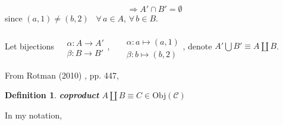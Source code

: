 \documentclass[10pt]{amsart}
\newtheorem{definition}{Definition}
\begin{document}
\begin{multicols*}{2}
\[
\Longrightarrow A' \cap B' = \emptyset 
\]
since $(a,1) \neq (b,2)$ \, $\forall \, a \in A$, $\forall \, b \in B$.

Let bijections $\begin{aligned} & \quad \\
& \alpha : A \to A' \\
& \beta : B \to B' \end{aligned}$, \qquad \, $\begin{aligned} & \quad \\
& \alpha : a \mapsto (a,1) \\
& \beta : b\mapsto (b,2) \end{aligned}$, denote $A'\bigcup B' \equiv A \coprod B$.

From Rotman (2010) \cite{JRotman2010}, pp. 447,
\begin{definition}
	\textbf{coproduct} $A \coprod B \equiv C \in \text{Obj}(\mathcal{C})$
\end{definition}

In my notation,


\end{multicols*}
\end{document}
